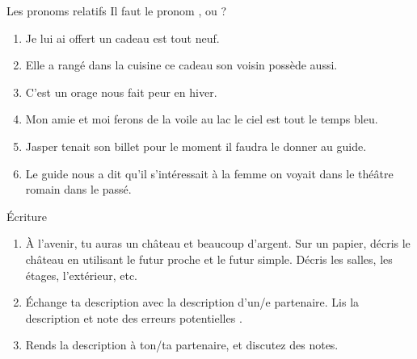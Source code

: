 \documentclass{beamer}
\begin{document}
  \begin{frame}{Les pronoms relatifs}
    Il faut le pronom ,  ou ?
    \begin{enumerate}
      \item Je lui ai offert un cadeau \underline{} est tout neuf.
      \item Elle a rangé dans la cuisine ce cadeau \underline{} son voisin possède aussi.
      \item C'est un orage \underline{} nous fait peur en hiver.
      \item Mon amie et moi ferons de la voile au lac \underline{} le ciel est tout le temps bleu.
      \item Jasper tenait son billet pour le moment \underline{} il faudra le donner au guide.
      \item Le guide nous a dit qu'il s'intéressait à la femme \underline{}on voyait dans le théâtre romain dans le passé.
    \end{enumerate}
  \end{frame}

  \begin{frame}{Écriture}
    \begin{enumerate}
      \item À l'avenir, tu auras un château et beaucoup d'argent. Sur un papier, décris le château en utilisant \alert{le futur proche} et \alert{le futur simple}. Décris les salles, les étages, l'extérieur, etc.
      \item<2-> Échange ta description avec la description d'un/e partenaire. Lis la description et note des erreurs potentielles .
      \item<3-> Rends la description à ton/ta partenaire, et discutez des notes.
    \end{enumerate}
  \end{frame}
\end{document}
